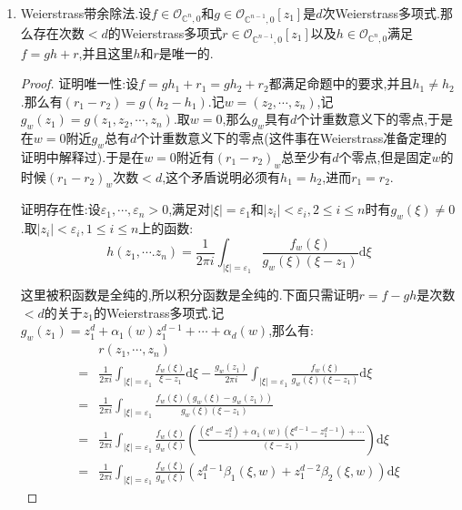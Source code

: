 \begin{enumerate}
\begin{proof}
    	必要性是因为$\mathscr{O}_{\mathbb{C}^{n-1},0}[z_1]$是$\mathscr{O}_{\mathbb{C}^n,0}$的子环.对于充分性,假设$g$是不可约的Weierstrass多项式,假设$g$是$\mathscr{O}_{\mathbb{C}^n,0}$中的可约元,那么有$g=g_1g_2$,其中$g_1,g_2\in\mathscr{O}_{\mathbb{C}^n,0}$都不是单位,按照Weierstrass准备定理,有分解$g_i=\widetilde{g_i}h_i$,其中$\widetilde{g_i}$是Weierstrass多项式,而$h_i$是$\mathscr{O}_{\mathbb{C}^n,0}$中的单位元,那么按照Weierstrass准备定理中的唯一性,就有$g=\widetilde{g_1}\widetilde{g_2}$和$h_1h_2=1$,但是$g$是$\mathscr{O}_{\mathbb{C}^{n-1},0}[z_1]$中的不可约元,迫使$\widetilde{g_1}$或者$\widetilde{g_2}$是单位,从而它也是$\mathscr{O}_{\mathbb{C}^n,0}$的单位,换句话讲$g_1,g_2$中有一个是单位.
    \end{proof}
    \item Weierstrass带余除法.设$f\in\mathscr{O}_{\mathbb{C}^n,0}$和$g\in\mathscr{O}_{\mathbb{C}^{n-1},0}[z_1]$是$d$次Weierstrass多项式.那么存在次数$<d$的Weierstrass多项式$r\in\mathscr{O}_{\mathbb{C}^{n-1},0}[z_1]$以及$h\in\mathscr{O}_{\mathbb{C}^n,0}$满足$f=gh+r$,并且这里$h$和$r$是唯一的.
    \begin{proof}
    	
    	证明唯一性:设$f=gh_1+r_1=gh_2+r_2$都满足命题中的要求,并且$h_1\not=h_2$.那么有$(r_1-r_2)=g(h_2-h_1)$.记$w=(z_2,\cdots,z_n)$,记$g_w(z_1)=g(z_1,z_2,\cdots,z_n)$.取$w=0$,那么$g_w$具有$d$个计重数意义下的零点,于是在$w=0$附近$g_w$总有$d$个计重数意义下的零点(这件事在Weierstrass准备定理的证明中解释过).于是在$w=0$附近有$(r_1-r_2)_w$总至少有$d$个零点,但是固定$w$的时候$(r_1-r_2)_w$次数$<d$,这个矛盾说明必须有$h_1=h_2$,进而$r_1=r_2$.
    	
    	\qquad
    	
    	证明存在性:设$\varepsilon_1,\cdots,\varepsilon_n>0$,满足对$|\xi|=\varepsilon_1$和$|z_i|<\varepsilon_i,2\le i\le n$时有$g_w(\xi)\not=0$.取$|z_i|<\varepsilon_i,1\le i\le n$上的函数:
    	$$h(z_1,\cdots.z_n)=\frac{1}{2\pi i}\int_{|\xi|=\varepsilon_1}\frac{f_w(\xi)}{g_w(\xi)(\xi-z_1)}\mathrm{d}\xi$$
    	
    	这里被积函数是全纯的,所以积分函数是全纯的.下面只需证明$r=f-gh$是次数$<d$的关于$z_1$的Weierstrass多项式.记$g_w(z_1)=z_1^d+\alpha_1(w)z_1^{d-1}+\cdots+\alpha_d(w)$,那么有:
    	\begin{align*}
    		&r(z_1,\cdots,z_n)\\
    		=&\frac{1}{2\pi i}\int_{|\xi|=\varepsilon_1}\frac{f_w(\xi)}{\xi-z_1}\mathrm{d}\xi-\frac{g_w(z_1)}{2\pi i}\int_{|\xi|=\varepsilon_1}\frac{f_w(\xi)}{g_w(\xi)(\xi-z_1)}\mathrm{d}\xi\\
    		=&\frac{1}{2\pi i}\int_{|\xi|=\varepsilon_1}\frac{f_w(\xi)(g_w(\xi)-g_w(z_1))}{g_w(\xi)(\xi-z_1)}\\
    		=&\frac{1}{2\pi i}\int_{|\xi|=\varepsilon_1}\frac{f_w(\xi)}{g_w(\xi)}\left(\frac{(\xi^d-z_1^d)+\alpha_1(w)(\xi^{d-1}-z_1^{d-1})+\cdots}{(\xi-z_1)}\right)\mathrm{d}\xi\\
    		=&\frac{1}{2\pi i}\int_{|\xi|=\varepsilon_1}\frac{f_w(\xi)}{g_w(\xi)}\left(z_1^{d-1}\beta_1(\xi,w)+z_1^{d-2}\beta_2(\xi,w)\right)\mathrm{d}\xi
    	\end{align*}
    

\end{proof}
\end{enumerate}
